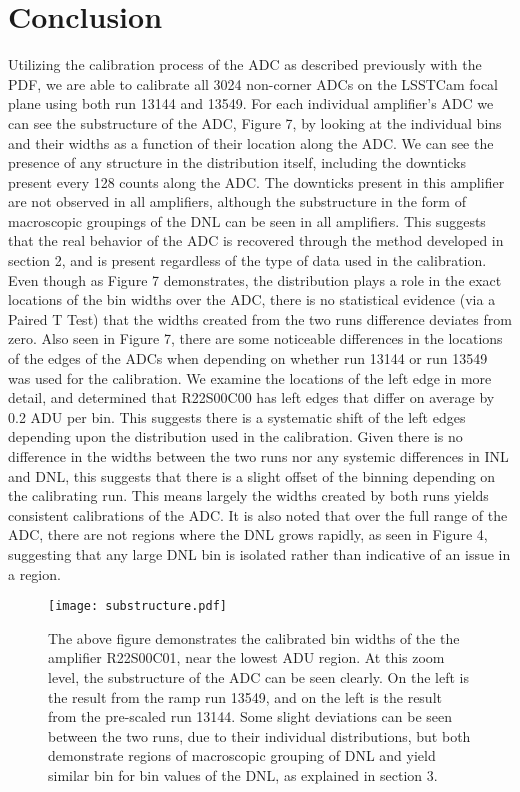 \documentclass[11pt, letterpaper]{article}
\begin{document}
\section{Conclusion}
\indent


Utilizing the calibration process of the ADC as described previously with the PDF, we are able to calibrate all 3024 non-corner ADCs on the LSSTCam focal plane using both run 13144 and 13549. 
For each individual amplifier’s ADC we can see the substructure of the ADC, Figure 7, by looking at the individual bins and their widths as a function of their location along the ADC. 
We can see the presence of any structure in the distribution itself, including the downticks present every 128 counts along the ADC. 
The downticks present in this amplifier are not observed in all amplifiers, although the substructure in the form of macroscopic groupings of the DNL can be seen in all amplifiers.
This suggests that the real behavior of the ADC is recovered through the method developed in section 2, and is present regardless of the type of data used in the calibration.
Even though as Figure 7 demonstrates, the distribution plays a role in the exact locations of the bin widths over the ADC, there is no statistical evidence (via a Paired T Test) that the widths created from the two runs difference deviates from zero.  
Also seen in Figure 7, there are some noticeable differences in the locations of the edges of the ADCs when depending on whether run 13144 or run 13549 was used for the calibration.
We examine the locations of the left edge in more detail, and determined that R22S00C00 has left edges that differ on average by 0.2 ADU per bin. 
This suggests there is a systematic shift of the left edges depending upon the distribution used in the calibration.
Given there is no difference in the widths between the two runs nor any systemic differences in INL and DNL, this suggests that there is a slight offset of the binning depending on the calibrating run.
This means largely the widths created by both runs yields consistent calibrations of the ADC. 
It is also noted that over the full range of the ADC, there are not regions where the DNL grows rapidly, as seen in Figure 4, suggesting that any large DNL bin is isolated rather than indicative of an issue in a region. 
\begin{figure}
	\texttt{[image: substructure.pdf]}
	\caption{The above figure demonstrates the calibrated bin widths of the the amplifier R22S00C01, near the lowest ADU region. At this zoom level, the substructure of the ADC can be seen clearly. On the left is the result from the ramp run 13549, and on the left is the result from the pre-scaled run 13144.  Some slight deviations can be seen between the two runs, due to their individual distributions, but both demonstrate regions of macroscopic grouping of DNL and yield similar bin for bin values of the DNL, as explained in section 3.}
\end{figure}
\indent 
\end{document}
